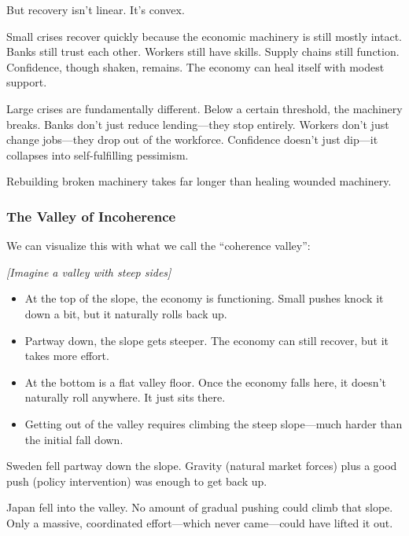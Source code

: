 But recovery isn't linear. It's convex.

Small crises recover quickly because the economic machinery is still mostly 
intact. Banks still trust each other. Workers still have skills. Supply 
chains still function. Confidence, though shaken, remains. The economy 
can heal itself with modest support.

Large crises are fundamentally different. Below a certain threshold, the 
machinery breaks. Banks don't just reduce lending---they stop entirely. 
Workers don't just change jobs---they drop out of the workforce. Confidence 
doesn't just dip---it collapses into self-fulfilling pessimism.

Rebuilding broken machinery takes far longer than healing wounded machinery.

\subsubsection{The Valley of Incoherence}

We can visualize this with what we call the ``coherence valley'':

\begin{center}
\textit{[Imagine a valley with steep sides]}
\end{center}

\begin{itemize}
    \item At the top of the slope, the economy is functioning. Small pushes 
    knock it down a bit, but it naturally rolls back up.
    
    \item Partway down, the slope gets steeper. The economy can still recover, 
    but it takes more effort.
    
    \item At the bottom is a flat valley floor. Once the economy falls here, 
    it doesn't naturally roll anywhere. It just sits there.
    
    \item Getting out of the valley requires climbing the steep slope---much 
    harder than the initial fall down.
\end{itemize}

Sweden fell partway down the slope. Gravity (natural market forces) plus 
a good push (policy intervention) was enough to get back up.

Japan fell into the valley. No amount of gradual pushing could climb 
that slope. Only a massive, coordinated effort---which never came---could 
have lifted it out.

